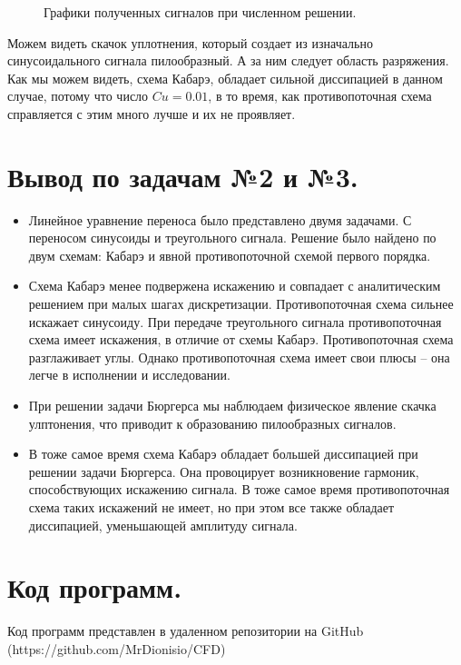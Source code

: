 \begin{figure}[H]
    \centering
    \hfill
    \hfill
    \caption{Графики полученных сигналов при численном решении.}
    \label{fig:31}
\end{figure}

Можем видеть скачок уплотнения, который создает из изначально синусоидального сигнала пилообразный. А за ним следует область разряжения. Как мы можем видеть, схема Кабарэ, обладает сильной диссипацией в данном случае, потому что число $Cu=0.01$, в то время, как противопоточная схема справляется с этим много лучше и их не проявляет.

\section{Вывод по задачам №2 и №3.}
\begin{itemize}
    \item Линейное уравнение переноса было представлено двумя задачами. С переносом синусоиды и треугольного сигнала. Решение было найдено по двум схемам: Кабарэ и явной противопоточной схемой первого порядка. 
    \item Схема Кабарэ менее подвержена искажению и совпадает с аналитическим решением при малых шагах дискретизации. Противопоточная схема сильнее искажает синусоиду.  При передаче треугольного сигнала противопоточная схема имеет искажения, в отличие от схемы Кабарэ. Противопоточная схема разглаживает углы. Однако противопоточная схема имеет свои плюсы – она легче в исполнении и исследовании.  
    \item При решении задачи Бюргерса мы наблюдаем физическое явление скачка улптонения, что приводит к образованию пилообразных сигналов.
    \item В тоже самое время схема Кабарэ обладает большей диссипацией при решении задачи Бюргерса. Она провоцирует возникновение гармоник, способствующих искажению сигнала. В тоже самое время противопоточная схема таких искажений не имеет, но при этом все также обладает диссипацией, уменьшающей амплитуду сигнала. 
\end{itemize}
\section{Код программ.}
Код программ представлен в удаленном репозитории на GitHub \\ (https://github.com/MrDionisio/CFD)
